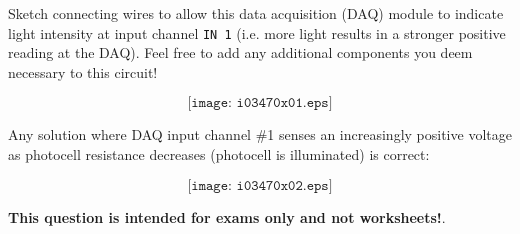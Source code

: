 

Sketch connecting wires to allow this data acquisition (DAQ) module to indicate light intensity at input channel {\tt IN 1} (i.e. more light results in a stronger positive reading at the DAQ).  Feel free to add any additional components you deem necessary to this circuit!

\vskip 50pt

$$\texttt{[image: i03470x01.eps]}$$







Any solution where DAQ input channel \#1 senses an increasingly positive voltage as photocell resistance decreases (photocell is illuminated) is correct:

$$\texttt{[image: i03470x02.eps]}$$







{\bf This question is intended for exams only and not worksheets!}.


